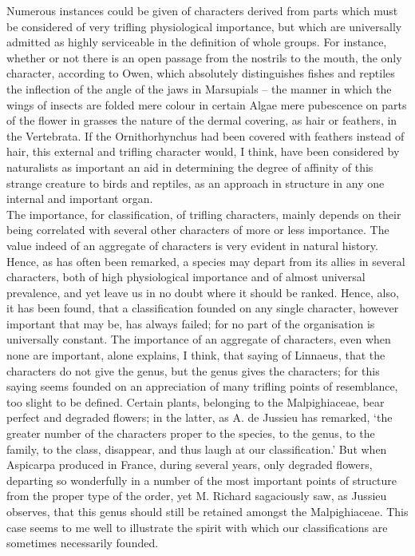 \indent Numerous instances could be given of characters derived from parts which must be considered of very trifling physiological importance, but which are universally admitted as highly serviceable in the definition of whole groups. For instance, whether or not there is an open passage from the nostrils to the mouth, the only character, according to Owen, which absolutely distinguishes fishes and reptiles the inflection of the angle of the jaws in Marsupials -- the manner in which the wings of insects are folded mere colour in certain Algae mere pubescence on parts of the flower in grasses the nature of the dermal covering, as hair or feathers, in the Vertebrata. If the Ornithorhynchus had been covered with feathers instead of hair, this external and trifling character would, I think, have been considered by naturalists as important an aid in determining the degree of affinity of this strange creature to birds and reptiles, as an approach in structure in any one internal and important organ.~\\
\indent The importance, for classification, of trifling characters, mainly depends on their being correlated with several other characters of more or less importance. The value indeed of an aggregate of characters is very evident in natural history. Hence, as has often been remarked, a species may depart from its allies in several characters, both of high physiological importance and of almost universal prevalence, and yet leave us in no doubt where it should be ranked. Hence, also, it has been found, that a classification founded on any single character, however important that may be, has always failed; for no part of the organisation is universally constant. The importance of an aggregate of characters, even when none are important, alone explains, I think, that saying of Linnaeus, that the characters do not give the genus, but the genus gives the characters; for this saying seems founded on an appreciation of many trifling points of resemblance, too slight to be defined. Certain plants, belonging to the Malpighiaceae, bear perfect and degraded flowers; in the latter, as A. de Jussieu has remarked, `the greater number of the characters proper to the species, to the genus, to the family, to the class, disappear, and thus laugh at our classification.' But when Aspicarpa produced in France, during several years, only degraded flowers, departing so wonderfully in a number of the most important points of structure from the proper type of the order, yet M. Richard sagaciously saw, as Jussieu observes, that this genus should still be retained amongst the Malpighiaceae. This case seems to me well to illustrate the spirit with which our classifications are sometimes necessarily founded.~\\
